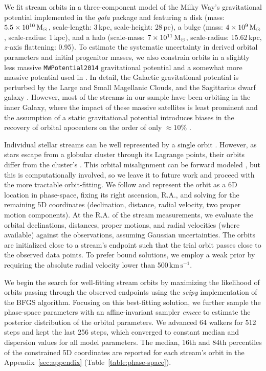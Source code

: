 \documentclass[twocolumn]{aastex63}
\newcommand{\package}[1]{\textsl{#1}}
\newcommand{\kms}{\ensuremath{\textrm{km}\,\textrm{s}^{-1}}}
\begin{document}
We fit stream orbits in a three-component model of the Milky Way's gravitational potential implemented in the \package{gala} package \citep{gala} and featuring a \citet{mn:1975} disk (mass: $5.5\times10^{10}\rm\, M_\odot$, scale-length: 3\,kpc, scale-height: 28\,pc), a \citet{hernquist:1990} bulge (mass: $4\times10^9\rm\, M_\odot$, scale-radius: 1\,kpc), and a \citet{nfw:1997} halo (scale-mass: $7\times10^{11}\rm\, M_\odot$, scale-radius: 15.62\,kpc, $z$-axis flattening: 0.95).
To estimate the systematic uncertainty in derived orbital parameters and initial progenitor masses, we also constrain orbits in a slightly less massive \texttt{MWPotential2014} gravitational potential \citep{bovy:2015} and a somewhat more massive potential used in \citet{pwb}.
In detail, the Galactic gravitational potential is perturbed by the Large and Small Magellanic Clouds, and the Sagittarius dwarf galaxy \citep{gomez:2015, erkal:2019, vasiliev:2020}.
However, most of the streams in our sample have been orbiting in the inner Galaxy, where the impact of these massive satellites is least prominent \citep{petersen:2020} and the assumption of a static gravitational potential introduces biases in the recovery of orbital apocenters on the order of only $\approx10\%$ \citep{garrow:2020}.


Individual stellar streams can be well represented by a single orbit \citep[e.g.,][]{koposov:2010, pwb, ibata:2019}.
However, as stars escape from a globular cluster through its Lagrange points, their orbits differ from the cluster's \citep{eyre:2011}.
This orbital misalignment can be forward modeled \citep{varghese:2011, bonaca:2014, sanders:2014}, but this is computationally involved, so we leave it to future work and proceed with the more tractable orbit-fitting.
We follow \citet{pwb} and represent the orbit as a 6D location in phase-space, fixing its right ascension, R.A., and solving for the remaining 5D coordinates (declination, distance, radial velocity, two proper motion components).
At the R.A. of the stream measurements, we evaluate the orbital declinations, distances, proper motions, and radial velocities (where available) against the observations, assuming Gaussian uncertainties.
The orbits are initialized close to a stream's endpoint such that the trial orbit passes close to the observed data points.
To prefer bound solutions, we employ a weak prior by requiring the absolute radial velocity lower than 500\,\kms.

We begin the search for well-fitting stream orbits by maximizing the likelihood of orbits passing through the observed endpoints using the \package{scipy} implementation of the BFGS algorithm.
Focusing on this best-fitting solution, we further sample the phase-space parameters with an affine-invariant sampler \package{emcee} to estimate the posterior distribution of the orbital parameters.
We advanced 64 walkers for 512 steps and kept the last 256 steps, which converged to constant median and dispersion values for all model parameters.
The median, 16th and 84th percentiles of the constrained 5D coordinates are reported for each stream's orbit in the Appendix~\ref{sec:appendix} (Table~\ref{table:phase-space}).
\end{document}
